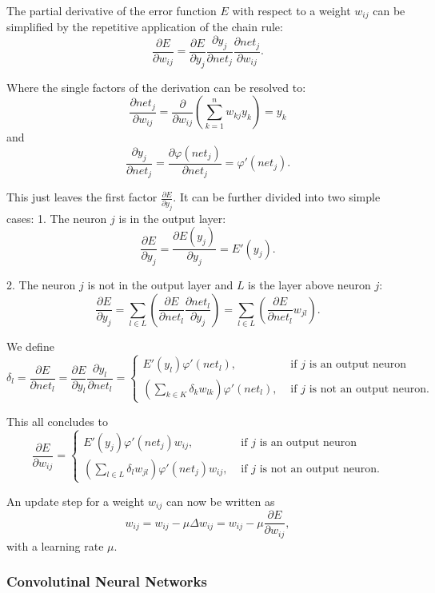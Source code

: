 The partial derivative of the error function $E$ with respect to a weight $w_{ij}$ can be simplified by the repetitive application of the chain rule:
\[
	\frac{\partial E}{\partial w_{ij}} = \frac{\partial E}{\partial y_j} \frac{\partial y_j}{\partial net_j} \frac{\partial net_j}{\partial w_{ij}} .
\]
 
Where the single factors of the derivation can be resolved to:
\[
	\frac{\partial net_j}{\partial w_{ij}} = \frac{\partial}{\partial w_{ij}} ( \sum_{k=1}^n w_{kj} y_k ) = y_k
\]
and 
\[
	\frac{\partial y_j}{\partial net_j} =  \frac{\partial \varphi(net_j)}{\partial net_j} = \varphi'(net_j).
\]


This just leaves the first factor $\frac{\partial E}{\partial y_j}$. It can be further divided into two simple cases:
1. The neuron $j$ is in the output layer:
\[
\frac{\partial E}{\partial y_j} = \frac{\partial E(y_j)}{\partial y_j} = E'(y_j).
\] 

2. The neuron $j$ is not in the output layer and $L$ is the layer above neuron $j$:
\[
\frac{\partial E}{\partial y_j} = \sum_{l \in L}( \frac{\partial E}{\partial net_l} \frac{\partial net_l}{\partial y_j} )  = \sum_{l \in L}( \frac{\partial E}{\partial net_l} w_{jl} ).
\] 

We define 
\[
\delta_l = \frac{\partial E}{\partial net_l} = \frac{\partial E}{\partial y_l} \frac{\partial y_l}{\partial net_l} =
\begin{cases}
E'(y_l) \varphi'(net_l), & \text{  if } j \text{ is an output neuron} \\
(\sum_{k \in K} \delta_k w_{lk}) \varphi'(net_l), & \text{  if } j \text{ is not an output neuron.}
\end{cases}
\]

This all concludes to 
\[
\frac{\partial E}{\partial w_{ij}} = 
\begin{cases}
E'(y_j) \varphi'(net_j) w_{ij}, & \text{  if } j \text{ is an output neuron} \\
(\sum_{l \in L} \delta_l w_{jl}) \varphi'(net_j) w_{ij}, & \text{  if } j \text{ is not an output neuron.}
\end{cases}
\]

An update step for a weight $w_{ij}$ can now be written as
\[
w_{ij} = w_{ij} - \mu \Delta w_{ij} = w_{ij} - \mu \frac{\partial E}{\partial w_{ij}},
\]
with a learning rate $\mu$.

\subsubsection{Convolutinal Neural Networks}

